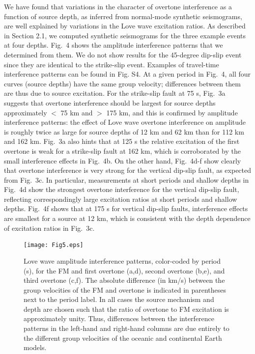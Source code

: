 \documentclass[extra,mreferee]{gji}
\begin{document}
We have found that variations in the character of overtone interference as a function of source depth, as inferred from normal-mode synthetic seismograms, are well explained by variations in the Love wave excitation ratios. As described in Section 2.1, we computed synthetic seismograms for the three example events at four depths. Fig.\ 4 shows the amplitude interference patterns that we determined from them. We do not show results for the 45-degree dip-slip event since they are identical to the strike-slip event. Examples of travel-time interference patterns can be found in Fig. S4. At a given period in Fig.\ 4, all four curves (source depths) have the same group velocity; differences between them are thus due to source excitation. For the strike-slip fault at 75 s, Fig.\ 3a suggests that overtone interference should be largest for source depths approximately $<$ 75 km and $>$ 175 km, and this is confirmed by amplitude interference patterns: the effect of Love wave overtone interference on amplitude is roughly twice as large for source depths of 12 km and 62 km than for 112 km and 162 km. Fig.\ 3a also hints that at 125 s the relative excitation of the first overtone is weak for a strike-slip fault at 162 km, which is corroborated by the small interference effects in Fig.\ 4b. On the other hand, Fig.\ 4d-f show clearly that overtone interference is very strong for the vertical dip-slip fault, as expected from Fig.\ 3c. In particular, measurements at short periods and shallow depths in Fig.\ 4d show the strongest overtone interference for the vertical dip-slip fault, reflecting correspondingly large excitation ratios at short periods and shallow depths. Fig.\ 4f shows that at 175 s for vertical dip-slip faults, interference effects are smallest for a source at 12 km, which is consistent with the depth dependence of excitation ratios in Fig.\ 3c. 

 \begin{figure}
 \texttt{[image: Fig5.eps]}
 \caption{Love wave amplitude interference patterns, color-coded by period (s), for the FM and first overtone (a,d), second overtone (b,e), and third overtone (c,f). The absolute difference (in km/s) between the group velocities of the FM and overtone is indicated in parentheses next to the period label. In all cases the source mechanism and depth are chosen such that the ratio of overtone to FM excitation is approximately unity. Thus, differences between the interference patterns in the left-hand and right-hand columns are due entirely to the different group velocities of the oceanic and continental Earth models. }
 \end{figure}
 
\end{document}
